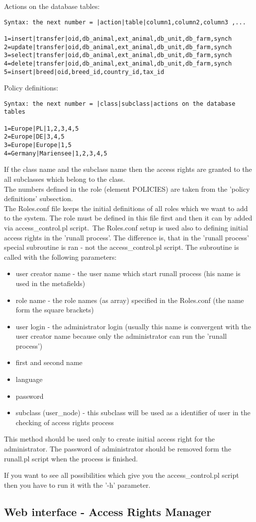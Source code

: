 Actions on the database tables:
\begin{verbatim}
Syntax: the next number = |action|table|column1,column2,column3 ,...

1=insert|transfer|oid,db_animal,ext_animal,db_unit,db_farm,synch
2=update|transfer|oid,db_animal,ext_animal,db_unit,db_farm,synch
3=select|transfer|oid,db_animal,ext_animal,db_unit,db_farm,synch
4=delete|transfer|oid,db_animal,ext_animal,db_unit,db_farm,synch
5=insert|breed|oid,breed_id,country_id,tax_id
\end{verbatim} 

Policy definitions:
\begin{verbatim}
Syntax: the next number = |class|subclass|actions on the database tables

1=Europe|PL|1,2,3,4,5
2=Europe|DE|3,4,5
3=Europe|Europe|1,5
4=Germany|Mariensee|1,2,3,4,5
\end{verbatim} 
If the class name and the subclass name then the access rights are granted to the all subclasses which belong to the class.\\
The numbers defined in the role (element POLICIES) are taken from the 'policy definitions' subsection.\\

The Roles.conf file keeps the initial definitions of all roles which we want to add to the system. The role must be defined in this file first and then it can by added via access\_control.pl script.\
The Roles.conf setup is used also to defining initial access rights in the 'runall process'.
The difference is, that in the 'runall process' special subroutine is ran - not the access\_control.pl script. The subroutine is called with the following parameters:
\begin{itemize}
\item user creator name - the user name which start runall process (his name is used in the metafields)
\item role name - the role names (as array) specified in the Roles.conf (the name form the square brackets)
\item user login - the administrator login (usually this name is convergent with the user creator name because only the administrator can run the 'runall process')
\item first and second name
\item language 
\item password  
\item subclass (user\_node) - this subclass will be used as a identifier of user in the checking of access rights process
\end{itemize} 
This method should be used only to create initial access right for the administrator. The password of administrator should be removed form the runall.pl script when the process is finished.

If you want to see all possibilities which give you the access\_control.pl script then you have to run it with the '-h' parameter.

\subsection{Web interface - Access Rights Manager}



